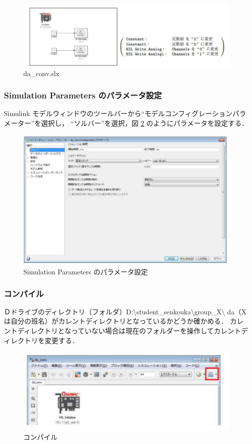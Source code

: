     \begin{figure}[H]
        \centering
        \includegraphics[width=0.8\linewidth]{figure/da_conv.pdf}
        \caption{da\_conv.slx}
        \label{fig:da_conv}
    \end{figure}
    
    \subsubsection{Simulation Parameters のパラメータ設定}

    Simulink モデルウィンドウのツールバーから``モデルコンフィグレーションパラメーター''を選択し，
    ``ソルバー''を選択，図 \ref{fig:sim_param} のようにパラメータを設定する．
    
    \begin{figure}[H]
        \centering
        \includegraphics[width=0.8\linewidth]{figure/sim_param.pdf}
        \caption{Simulation Parameters のパラメータ設定}
        \label{fig:sim_param}
    \end{figure}
    
    \subsubsection{コンパイル}
    Ｄドライブのディレクトリ（フォルダ）D:\textbackslash student\_senkouka\textbackslash group\_X\textbackslash 
    da（Xは自分の班名）がカレントディレクトリとなっているかどうか確かめる．
    カレントディレクトリとなっていない場合は現在のフォルダーを操作してカレントディレクトリを変更する．
    
    \begin{figure}[H]
        \centering
        \includegraphics[width=0.8\linewidth]{figure/compile_button.pdf}
        \caption{コンパイル}
        \label{fig:compile_button}
    \end{figure}
    